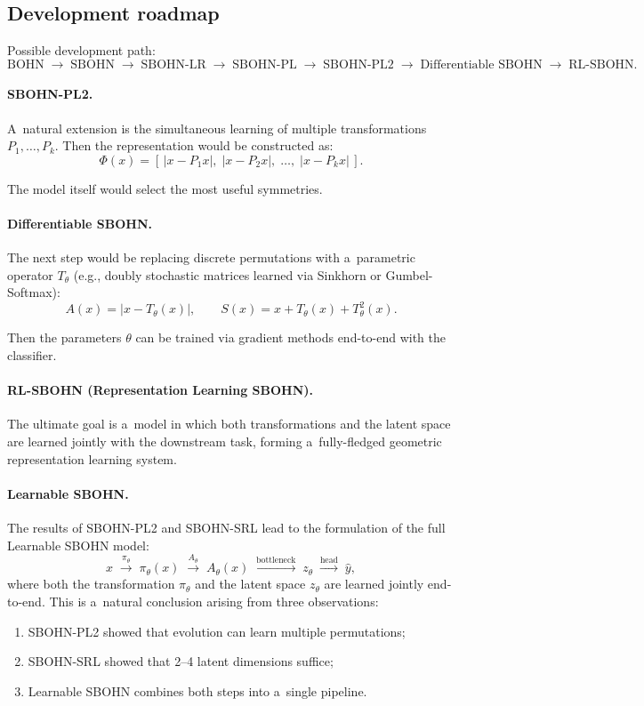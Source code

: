 \documentclass[11pt,a4paper]{report}
\begin{document}
\subsection{Development roadmap}

Possible development path:
\[
\text{BOHN}
\;\to\;
\text{SBOHN}
\;\to\;
\text{SBOHN-LR}
\;\to\;
\text{SBOHN-PL}
\;\to\;
\text{SBOHN-PL2}
\;\to\;
\text{Differentiable SBOHN}
\;\to\;
\text{RL-SBOHN}.
\]

\paragraph{SBOHN-PL2.}
A~natural extension is the simultaneous learning of multiple transformations $P_1,\ldots,P_k$. Then the representation would be constructed as:
\[
\Phi(x)
=
[\,|x-P_1x|,\;|x-P_2x|,\;\dots,\;|x-P_kx|\,].
\]

The model itself would select the most useful symmetries.

\paragraph{Differentiable SBOHN.}
The next step would be replacing discrete permutations with a~parametric operator $T_\theta$ (e.g., doubly stochastic matrices learned via Sinkhorn or Gumbel-Softmax):
\[
A(x)=|x-T_\theta(x)|,\qquad
S(x)=x+T_\theta(x)+T_\theta^2(x).
\]

Then the parameters $\theta$ can be trained via gradient methods end-to-end with the classifier.

\paragraph{RL-SBOHN (Representation Learning SBOHN).}
The ultimate goal is a~model in which both transformations and the latent space are learned jointly with the downstream task, forming a~fully-fledged geometric representation learning system.
\paragraph{Learnable SBOHN.}
The results of SBOHN-PL2 and SBOHN-SRL lead to the formulation of the full Learnable SBOHN model:
\[
x \;\xrightarrow{\pi_\theta}\; \pi_\theta(x) \;\xrightarrow{A_\theta}\; A_\theta(x) \;\xrightarrow{\text{bottleneck}}\; z_\theta \;\xrightarrow{\text{head}}\; \hat{y},
\]
where both the transformation $\pi_\theta$ and the latent space $z_\theta$ are learned jointly end-to-end. This is a~natural conclusion arising from three observations:
\begin{enumerate}
\item SBOHN-PL2 showed that evolution can learn multiple permutations;
\item SBOHN-SRL showed that 2--4 latent dimensions suffice;
\item Learnable SBOHN combines both steps into a~single pipeline.
\end{enumerate}
\end{document}
